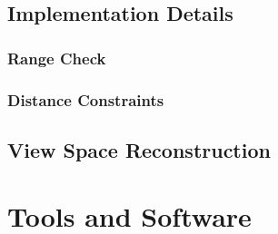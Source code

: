 \documentclass{beamer}
\begin{document}

\subsection{Implementation Details}

\subsubsection{Range Check}
\subsubsection{Distance Constraints}


\subsection{View Space Reconstruction}

\section{Tools and Software}

\end{document}
